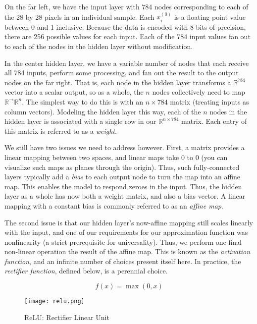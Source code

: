 On the far left, we have the input layer with \(784\) nodes
corresponding to each of the 28 by 28 pixels in an individual sample.
Each \(x_i^{(0)}\) is a floating point value between 0 and 1 inclusive.
Because the data is encoded with 8 bits of precision, there are 256
possible values for each input. Each of the 784 input values fan out to
each of the nodes in the hidden layer without modification.

In the center hidden layer, we have a variable number of nodes that each
receive all 784 inputs, perform some processing, and fan out the result
to the output nodes on the far right. That is, each node in the hidden
layer transforms a \(\mathbb{R}^{784}\) vector into a scalar output, so
as a whole, the \(n\) nodes collectively need to map
\(\mathbb{R}^\rightarrow \mathbb{R}^n\). The simplest way to do this is
with an \(n\times 784\) matrix (treating inputs as column vectors).
Modeling the hidden layer this way, each of the \(n\) nodes in the
hidden layer is associated with a single row in our
\(\mathbb{R}^{n\times 784}\) matrix. Each entry of this matrix is
referred to as a \emph{weight}.

We still have two issues we need to address however. First, a matrix
provides a linear mapping between two spaces, and linear maps take \(0\)
to \(0\) (you can visualize such maps as planes through the origin).
Thus, such fully-connected layers typically add a \emph{bias} to each
output node to turn the map into an affine map. This enables the model
to respond zeroes in the input. Thus, the hidden layer as a whole has
now both a weight matrix, and also a bias vector. A linear mapping with
a constant bias is commonly referred to as an \emph{affine map}.

The second issue is that our hidden layer's now-affine mapping still
scales linearly with the input, and one of our requirements for our
approximation function was nonlinearity (a strict prerequisite for
universality). Thus, we perform one final non-linear operation the
result of the affine map. This is known as the \emph{activation
	function}, and an infinite number of choices present itself here. In
practice, the \emph{rectifier function}, defined below, is a perennial
choice.

\[f(x) = \max(0, x)\]

\begin{figure}
	\centering
	\texttt{[image: relu.png]}
	\caption{ReLU: Rectifier Linear Unit}
	\label{fig:relu}
\end{figure}

